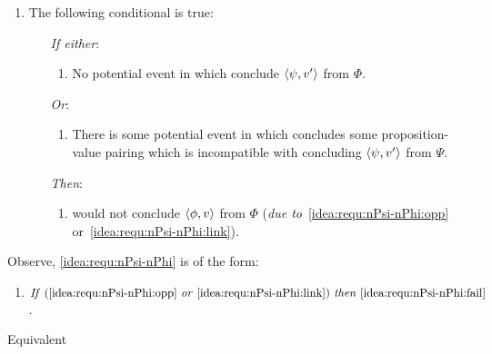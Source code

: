 \begin{note}[\requ{3}]
\begin{definition}[A \requ{0}]
\begin{itemize}
      \begin{enumerate}[label=\arabic*., ref=\named{R:\arabic*}, resume]
      \item
        \label{idea:requ:nPsi-nPhi}
        The following conditional is true:
        \begin{enumerate}
        \item[\emph{If either}:]
          \begin{enumerate}[label=\alph*., ref=\named{R:2\alph*}]
          \item
            \label{idea:requ:nPsi-nPhi:opp}
            No potential event in which conclude \(\langle \psi, v' \rangle\) from \(\Phi\).
          \end{enumerate}
        \item[\emph{Or}:]
          \begin{enumerate}[label=\alph*., ref=\named{R:2\alph*}, resume]
          \item
            \label{idea:requ:nPsi-nPhi:link}
            There is some potential event in which \vAgent{} concludes some proposition-value pairing which is incompatible with concluding \(\langle \psi, v' \rangle\) from \(\Psi\).
          \end{enumerate}
        \item[\emph{Then}:]
          \begin{enumerate}[label=\alph*., ref=\named{R:2\alph*}, resume]
          \item
            \label{idea:requ:nPsi-nPhi:fail}
            \vAgent{} would not conclude \(\langle \phi, v \rangle\) from \(\Phi\) (\emph{due to}~\ref{idea:requ:nPsi-nPhi:opp} or~\ref{idea:requ:nPsi-nPhi:link}).
          \end{enumerate}
        \end{enumerate}
      \end{enumerate}
    \end{itemize}
    \vspace{-\baselineskip}
  \end{definition}

  Observe, \ref{idea:requ:nPsi-nPhi} is of the form:

  \begin{enumerate}
  \item
    \(\text{\emph{If} } (\ref{idea:requ:nPsi-nPhi:opp} \text{ \emph{or} } \ref{idea:requ:nPsi-nPhi:link}) \text{ \emph{then} } \ref{idea:requ:nPsi-nPhi:fail}\).
  \end{enumerate}

  Equivalent


\end{note}
